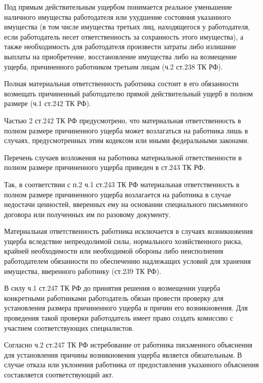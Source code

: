 \documentclass[a4paper]{article}
\begin{document}
		Под прямым действительным ущербом понимается реальное уменьшение наличного имущества работодателя или ухудшение состояния указанного имущества (в том числе имущества третьих лиц, находящегося у работодателя, если работодатель несет ответственность за сохранность этого имущества), а также необходимость для работодателя произвести затраты либо излишние выплаты на приобретение, восстановление имущества либо на возмещение ущерба, причиненного работником третьим лицам (ч.2 ст.238 ТК РФ).
		
		Полная материальная ответственность работника состоит в его обязанности возмещать причиненный работодателю прямой действительный ущерб в полном размере (ч.1 ст.242 ТК РФ).
		
		Частью 2 ст.242 ТК РФ предусмотрено, что материальная ответственность в полном размере причиненного ущерба может возлагаться на работника лишь в случаях, предусмотренных этим кодексом или иными федеральными законами.
		
		Перечень случаев возложения на работника материальной ответственности в полном размере причиненного ущерба приведен в ст.243 ТК РФ.
		
		Так, в соответствии с п.2 ч.1 ст.243 ТК РФ материальная ответственность в полном размере причиненного ущерба возлагается на работника в случае недостачи ценностей, вверенных ему на основании специального письменного договора или полученных им по разовому документу.
		
		Материальная ответственность работника исключается в случаях возникновения ущерба вследствие непреодолимой силы, нормального хозяйственного риска, крайней необходимости или необходимой обороны либо неисполнения работодателем обязанности по обеспечению надлежащих условий для хранения имущества, вверенного работнику (ст.239 ТК РФ).
		
		В силу ч.1 ст.247 ТК РФ до принятия решения о возмещении ущерба конкретными работниками работодатель обязан провести проверку для установления размера причиненного ущерба и причин его возникновения. Для проведения такой проверки работодатель имеет право создать комиссию с участием соответствующих специалистов.
		
		Согласно ч.2 ст.247 ТК РФ истребование от работника письменного объяснения для установления причины возникновения ущерба является обязательным. В случае отказа или уклонения работника от предоставления указанного объяснения составляется соответствующий акт.
		
\end{document}
